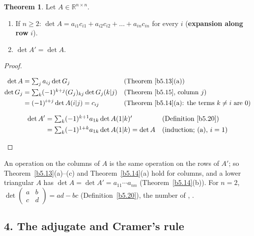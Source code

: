 \documentclass[12pt]{article}
\newcommand{\R}{\mathbb R}
\theoremstyle{definition}
\newtheorem{theorem}{Theorem}
\newcommand{\boardtop}{\vspace*{-\abovedisplayskip}}
\DeclareMathOperator{\row}{row}
\begin{document}
\begin{theorem}\label{b5.21}\label{b5.22}
Let \(A\in\R^{n\times n}\).
\begin{enumerate}
\item If \(n\geqslant2\): \(\det A=a_{i1}c_{i1}+a_{i2}c_{i2}+\dots+a_{in}c_{in}\) for every \(i\) (\textbf{expansion along row}
\(i\)).
\item \(\det A'=\det A\).
\end{enumerate}
\end{theorem}
\begin{proof}
\begin{board}[(a) \(\row_i(A)=\sum_ja_{ij}e_j'\); \(G_j\) = \(A\) with row \(i\) replaced by \(e_j'\): its entry
\((i,j)\) is \(1\), \(G_j(i|j)=A(i|j)\), and for \(k\ne i\), \(G_j(k|j)\) has a zero row (row \(i\) of \(G_j\) without
its entry \(j\)):]
\boardtop
\begin{align*}
\det A&=\textstyle\sum_ja_{ij}\det G_j&&\text{(Theorem~\ref{b5.13}(a))}\\
\det G_j&=\textstyle\sum_k(-1)^{k+j}(G_j)_{kj}\det G_j(k|j)&&\text{(Theorem~\ref{b5.15}, column \(j\))}\\
&=(-1)^{i+j}\det A(i|j)=c_{ij}&&\text{(Theorem~\ref{b5.14}(a): the terms \(k\ne i\) are \(0\))}
\end{align*}
\end{board}
\begin{board}[(b) Induction on \(n\); \(n=1\): \(A'=A\). For \(n\geqslant2\), \(A'(k|1)=A(1|k)'\):]
\boardtop
\begin{align*}
\det A'&=\textstyle\sum_k(-1)^{k+1}a_{1k}\det A(1|k)'&&\text{(Definition~\ref{b5.20})}\\
&=\textstyle\sum_k(-1)^{1+k}a_{1k}\det A(1|k)=\det A&&\text{(induction; (a), \(i=1\))}
\end{align*}
\end{board}
\nopagebreak
\end{proof}
An operation on the columns of \(A\) is the same operation on the rows of \(A'\); so Theorem~\ref{b5.13}(a)--(c) and
Theorem~\ref{b5.14}(a) hold for columns, and a lower triangular \(A\) has \(\det A=\det A'=a_{11}\cdots a_{nn}\)
(Theorem~\ref{b5.14}(b)). For \(n=2\), \(\det\left(\begin{smallmatrix}a&b\\c&d\end{smallmatrix}\right)=ad-bc\) (Definition~\ref{b5.20}), the number of
, .

\subsection*{4. The adjugate and Cramer's rule}
\end{document}

